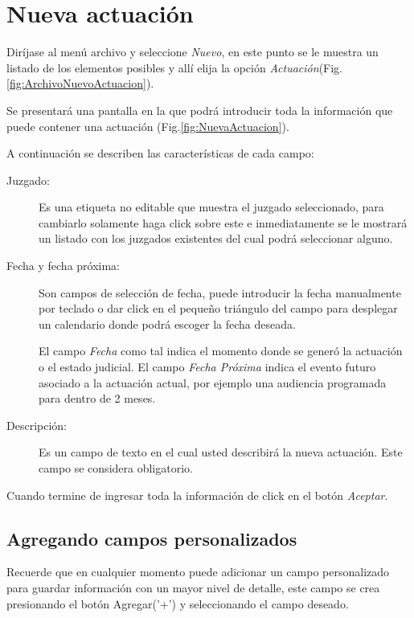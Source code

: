 \section{Nueva actuaci\'on}
\label{sec:nuevaActuacion}
Dir\'ijase al men\'u archivo y seleccione \emph{Nuevo}, en este punto se le muestra un listado de los elementos posibles y
all\'i elija la opci\'on \emph{Actuaci\'on}(Fig.\ref{fig:ArchivoNuevoActuacion}). 
  

Se presentar\'a una pantalla en la que podr\'a introducir toda la informaci\'on
que puede contener una actuaci\'on (Fig.\ref{fig:NuevaActuacion}). 
  

 A continuaci\'on se describen las
caracter\'isticas de cada campo:

\begin{description}
\item[Juzgado:]Es una etiqueta no editable que muestra el juzgado
seleccionado, para cambiarlo solamente haga click sobre este
\footnotemark[\value{footnote}]
e inmediatamente
se le mostrar\'a un listado con los juzgados existentes del cual podr\'a
seleccionar alguno.
\item[Fecha y fecha pr\'oxima:]Son campos de selecci\'on de fecha, puede introducir la fecha manualmente por teclado o dar click en el peque\~no tri\'angulo del campo para desplegar un calendario donde podr\'a escoger la fecha deseada.

El campo \emph{Fecha} como tal indica el momento donde se gener\'o la actuaci\'on o el estado judicial. El campo \emph{Fecha Pr\'oxima} indica el evento futuro asociado a la actuaci\'on actual, por ejemplo una audiencia programada para dentro de 2 meses. 
\item[Descripci\'on:]Es un campo de texto en el cual usted describir\'a la
nueva actuaci\'on. Este campo se considera obligatorio.
\end{description}

Cuando termine de ingresar toda la informaci\'on de click en el bot\'on \emph{Aceptar}.

\subsection{Agregando campos personalizados}
\label{sec:agregarCamposActuacion}
Recuerde que en cualquier momento puede adicionar un campo personalizado para guardar informaci\'on con un mayor nivel de detalle, este campo se crea presionando el bot\'on Agregar('+') y seleccionando el campo deseado.

